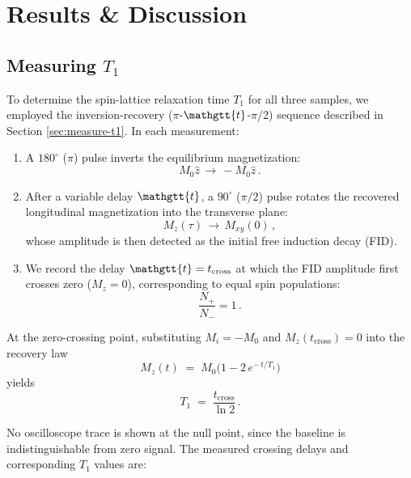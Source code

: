 \documentclass[
    floatfix,  %
    reprint,
    amsmath,
    amssymb,
    aps,
]{revtex4-2}
\newcommand{\taucode}{\mathgtt{t}}
\begin{document}
\section{Results \& Discussion}




\subsection{Measuring $T_1$}

To determine the spin-lattice relaxation time $T_1$ for all three samples, we employed the inversion-recovery ($\pi$-$\taucode$-$\pi$/2) sequence described in Section \ref{sec:measure-t1}. In each measurement:

\begin{enumerate}
    \item A $180^\circ$ ($\pi$) pulse inverts the equilibrium magnetization:
        \begin{equation}
            M_0\hat{z}\,\longrightarrow\,-M_0\hat{z}\,.
        \end{equation}
    \item After a variable delay $\taucode$, a $90^\circ$ ($\pi/2$) pulse rotates the recovered longitudinal magnetization into the transverse plane:
        \begin{equation}
            M_z(\tau)\,\longrightarrow\,M_{xy}(0)\,,
        \end{equation}
        whose amplitude is then detected as the initial free induction decay (FID).
    \item We record the delay $\taucode = t_{\mathrm{cross}}$ at which the FID amplitude first crosses zero ($M_z=0$), corresponding to equal spin populations:
        \begin{equation}
            \frac{N_{+}}{N_{-}} = 1\,.
        \end{equation}
\end{enumerate}


At the zero-crossing point, substituting $M_i=-M_0$ and $M_z(t_{\mathrm{cross}})=0$ into the recovery law
\begin{equation}
    M_z(t) \;=\; M_0\bigl(1 - 2\,e^{-\,t/T_1}\bigr)
\end{equation}
yields
\begin{equation}
    T_1 \;=\;\frac{t_{\mathrm{cross}}}{\ln 2}\,.
\end{equation}

No oscilloscope trace is shown at the null point, since the baseline is indistinguishable from zero signal. The measured crossing delays and corresponding $T_1$ values are:
\end{document}
